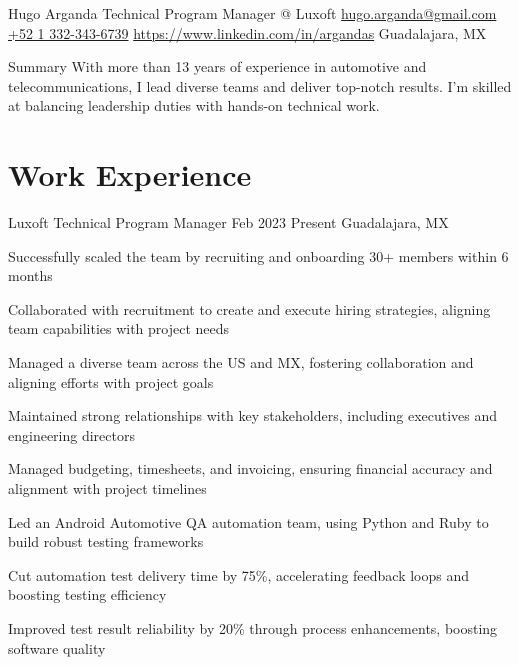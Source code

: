 \documentclass{resume} %
\begin{document}

\customheader
    {Hugo Arganda}
    {Technical Program Manager @ Luxoft}
    {\href{mailto:hugo.arganda@gmail.com}{hugo.arganda@gmail.com}}
    {\href{https://wa.me/5213323436739}{+52 1 332-343-6739}}
    {\href{https://www.linkedin.com/in/argandas}{https://www.linkedin.com/in/argandas}}
    {Guadalajara, MX}



\summary
{Summary}
    {With more than 13 years of experience in automotive and telecommunications, I lead diverse teams and deliver top-notch results. I'm skilled at balancing leadership duties with hands-on technical work.}



\section{Work Experience}


\job
    {Luxoft}
    {Technical Program Manager}
    {Feb 2023}
    {Present}
    {Guadalajara, MX}
    {
    \begin{itemize-bullets}
    \item{Successfully scaled the team by recruiting and onboarding 30+ members within 6 months}
    \item{Collaborated with recruitment to create and execute hiring strategies, aligning team capabilities with project needs}
    \item{Managed a diverse team across the US and MX, fostering collaboration and aligning efforts with project goals}
    \item{Maintained strong relationships with key stakeholders, including executives and engineering directors}
    \item{Managed budgeting, timesheets, and invoicing, ensuring financial accuracy and alignment with project timelines}
    \item{Led an Android Automotive QA automation team, using Python and Ruby to build robust testing frameworks}
    \item{Cut automation test delivery time by 75\%, accelerating feedback loops and boosting testing efficiency}
    \item{Improved test result reliability by 20\% through process enhancements, boosting software quality}
    \end{itemize-bullets}
    }
\end{document}
